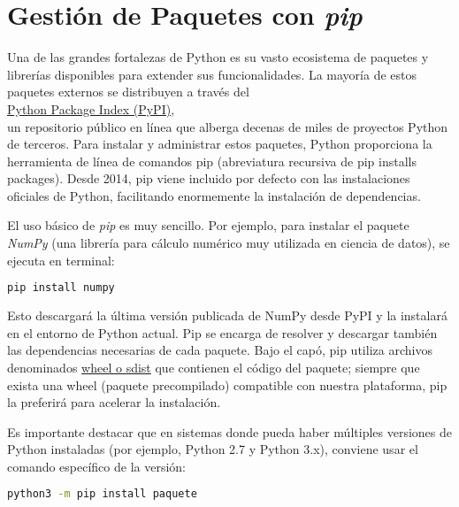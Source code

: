 \section{Gestión de Paquetes con \textit{pip}}

Una de las grandes fortalezas de Python es su vasto ecosistema de paquetes y 
librerías disponibles para extender sus funcionalidades. La mayoría de estos 
paquetes externos se distribuyen a través del 
\\
\href{https://pypi.org/}{Python Package Index (PyPI)},
\\

un repositorio público en línea que alberga decenas de miles de proyectos Python 
de terceros. Para instalar y administrar estos paquetes, Python proporciona 
la herramienta de línea de comandos pip (abreviatura recursiva de 
pip installs packages). Desde 2014, pip viene incluido por defecto con las 
instalaciones oficiales de Python, 
facilitando enormemente la instalación de dependencias.


El uso básico de \textit{pip} es muy sencillo. Por ejemplo, para instalar el paquete 
\textit{NumPy} (una librería para cálculo numérico muy utilizada en ciencia de datos), 
se ejecuta en terminal:

\begin{lstlisting}[language=bash, caption={Instalación con pip}]
pip install numpy
\end{lstlisting}

Esto descargará la última versión publicada de NumPy desde PyPI y la instalará 
en el entorno de Python actual. Pip se encarga de resolver y descargar también 
las dependencias necesarias de cada paquete. Bajo el capó, pip utiliza archivos 
denominados \href{https://pip.pypa.io/en/stable/cli/pip_wheel/}{wheel o sdist} 
que contienen el código del paquete; siempre que exista
una wheel (paquete precompilado) compatible con nuestra plataforma, 
pip la preferirá para acelerar la instalación.

Es importante destacar que en sistemas donde pueda haber múltiples versiones 
de Python instaladas (por ejemplo, Python 2.7 y Python 3.x), conviene usar 
el comando específico de la versión:

\begin{lstlisting}[language=bash, caption={Uso explícito de la versión de Python}]
python3 -m pip install paquete
\end{lstlisting}

